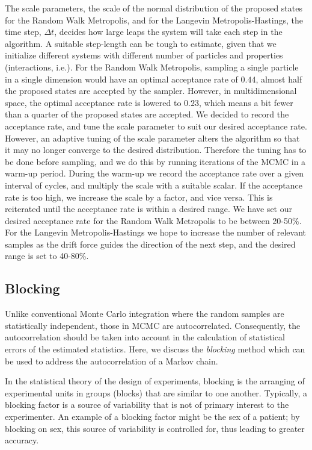 The scale parameters, the scale of the normal distribution of the proposed states for the Random Walk Metropolis, and for the Langevin Metropolis-Hastings, the time step, $\Delta t$, decides how large leaps the system will take each step in the algorithm. A suitable step-length can be tough to estimate, given that we initialize different systems with different number of particles and properties (interactions, i.e.). For the Random Walk Metropolis, sampling a single particle in a single dimension would have an optimal acceptance rate of $0.44$, almost half the proposed states are accepted by the sampler. However, in multidimensional space, the optimal acceptance rate is lowered to $0.23$, which means a bit fewer than a quarter of the proposed states are accepted. We decided to record the acceptance rate, and tune the scale parameter to suit our desired acceptance rate. However, an adaptive tuning of the scale parameter alters the algorithm so that it may no longer converge to the desired distribution. Therefore the tuning has to be done before sampling, and we do this by running iterations of the MCMC in a warm-up period. During the warm-up we record the acceptance rate over a given interval of cycles, and multiply the scale with a suitable scalar. If the acceptance rate is too high, we increase the scale by a factor, and vice versa. This is reiterated until the acceptance rate is within a desired range. We have set our desired acceptance rate for the Random Walk Metropolis to be between 20-50\%. For the Langevin Metropolis-Hastings we hope to increase the number of relevant samples as the drift force guides the direction of the next step, and the desired range is set to 40-80\%.


\subsection{Blocking}\label{sec:blocking}

Unlike conventional Monte Carlo integration where the random samples are statistically independent, those in MCMC are autocorrelated. Consequently, the autocorrelation should be taken into account in the calculation of statistical errors of the estimated statistics. Here, we discuss the \textit{blocking} method \citep{doi:10.1063/1.457480} which can be used to address the autocorrelation of a Markov chain.   

In the statistical theory of the design of experiments, blocking is the arranging of experimental units in groups (blocks) that are similar to one another. Typically, a blocking factor is a source of variability that is not of primary interest to the experimenter. An example of a blocking factor might be the sex of a patient; by blocking on sex, this source of variability is controlled for, thus leading to greater accuracy.

